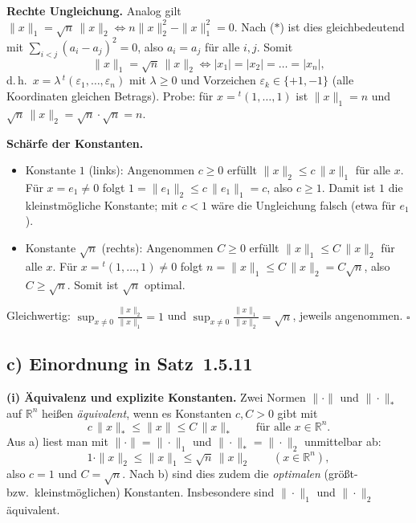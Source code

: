\documentclass[a4paper,11pt]{article}
\begin{document}
\textbf{Rechte Ungleichung.} Analog gilt $\|x\|_1=\sqrt{n}\,\|x\|_2\iff n\|x\|_2^2-\|x\|_1^2=0$. Nach ($\ast$) ist dies gleichbedeutend mit $\sum_{i<j}(a_i-a_j)^2=0$, also $a_i=a_j$ für alle $i,j$. Somit
\[
\|x\|_1=\sqrt{n}\,\|x\|_2\iff |x_1|=|x_2|=\dots=|x_n| ,
\]
d.\,h.\ $x=\lambda\,{}^t(\varepsilon_1,\dots,\varepsilon_n)$ mit $\lambda\ge 0$ und Vorzeichen $\varepsilon_k\in\{+1,-1\}$ (alle Koordinaten gleichen Betrags). Probe: für $x={}^t(1,\dots,1)$ ist $\|x\|_1=n$ und $\sqrt{n}\,\|x\|_2=\sqrt{n}\cdot\sqrt{n}=n$.

\textbf{Schärfe der Konstanten.}
\begin{itemize}
  \item Konstante $1$ (links): Angenommen $c\ge 0$ erfüllt $\|x\|_2\le c\,\|x\|_1$ für alle $x$. Für $x=e_1\ne 0$ folgt $1=\|e_1\|_2\le c\,\|e_1\|_1=c$, also $c\ge 1$. Damit ist $1$ die kleinstmögliche Konstante; mit $c<1$ wäre die Ungleichung falsch (etwa für $e_1$).
  \item Konstante $\sqrt{n}$ (rechts): Angenommen $C\ge 0$ erfüllt $\|x\|_1\le C\,\|x\|_2$ für alle $x$. Für $x={}^t(1,\dots,1)\ne 0$ folgt $n=\|x\|_1\le C\,\|x\|_2=C\sqrt{n}$, also $C\ge\sqrt{n}$. Somit ist $\sqrt{n}$ optimal.
\end{itemize}
Gleichwertig: $\displaystyle\sup_{x\ne 0}\frac{\|x\|_2}{\|x\|_1}=1$ und $\displaystyle\sup_{x\ne 0}\frac{\|x\|_1}{\|x\|_2}=\sqrt{n}$, jeweils angenommen. $\square$

\subsection*{c) Einordnung in Satz~1.5.11}
\textbf{(i) Äquivalenz und explizite Konstanten.} Zwei Normen $\|\cdot\|$ und $\|\cdot\|_\ast$ auf $\mathbb{R}^n$ heißen \emph{äquivalent}, wenn es Konstanten $c,C>0$ gibt mit
\[
c\,\|x\|_\ast\le\|x\|\le C\,\|x\|_\ast\qquad\text{für alle } x\in\mathbb{R}^n .
\]
Aus a) liest man mit $\|\cdot\|=\|\cdot\|_1$ und $\|\cdot\|_\ast=\|\cdot\|_2$ unmittelbar ab:
\[
1\cdot\|x\|_2\le\|x\|_1\le\sqrt{n}\,\|x\|_2\qquad(x\in\mathbb{R}^n),
\]
also $c=1$ und $C=\sqrt{n}$. Nach b) sind dies zudem die \emph{optimalen} (größt- bzw.\ kleinstmöglichen) Konstanten. Insbesondere sind $\|\cdot\|_1$ und $\|\cdot\|_2$ äquivalent.
\end{document}
